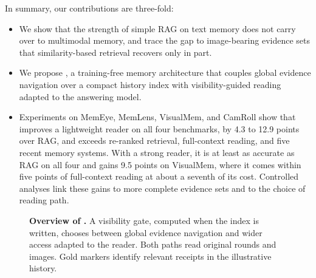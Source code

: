 In summary, our contributions are three-fold:
\begin{itemize}
\setlength{\itemsep}{1pt}
\setlength{\parskip}{0pt}
\item We show that the strength of simple RAG on text memory does not carry over to multimodal memory, and trace the gap to image-bearing evidence sets that similarity-based retrieval recovers only in part.
\item We propose \vgs{}, a training-free memory architecture that couples global evidence navigation over a compact history index with visibility-guided reading adapted to the answering model.
\item Experiments on MemEye, MemLens, VisualMem, and CamRoll show that \vgs{} improves a lightweight reader on all four benchmarks, by 4.3 to 12.9 points over RAG, and exceeds re-ranked retrieval, full-context reading, and five recent memory systems. With a strong reader, it is at least as accurate as RAG on all four and gains 9.5 points on VisualMem, where it comes within five points of full-context reading at about a seventh of its cost. Controlled analyses link these gains to more complete evidence sets and to the choice of reading path.
\end{itemize}

\begin{figure}[t]
\centering
\resizebox{\textwidth}{!}{}
\caption{\textbf{Overview of \vgs{}.} A visibility gate, computed when the index is written, chooses between global evidence navigation and wider access adapted to the reader. Both paths read original rounds and images. Gold markers identify relevant receipts in the illustrative history.}
\label{fig:overview}
\end{figure}
